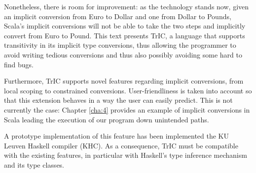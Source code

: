 Nonetheless, there is room for improvement: as the technology stands now, given an implicit conversion from Euro to Dollar and one from Dollar to Pounds, Scala's implicit conversions will not be able to take the two steps and implicitly convert from Euro to Pound. This text presents TrIC, a language that supports transitivity in its implicit type conversions, thus allowing the programmer to avoid writing tedious conversions and thus also possibly avoiding some hard to find bugs.

Furthermore, TrIC supports novel features regarding implicit conversions, from local scoping to constrained conversions. User-friendliness is taken into account so that this extension behaves in a way the user can easily predict. This is not currently the case: Chapter \ref{cha:4} provides an example of implicit conversions in Scala leading the execution of our program down unintended paths.

A prototype implementation of this feature has been implemented the KU Leuven Haskell compiler (KHC). As a consequence, TrIC must be compatible with the existing features, in particular with Haskell's type inference mechanism and its type classes.

